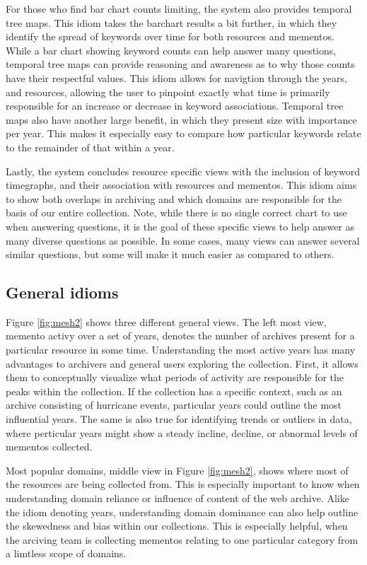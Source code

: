 \documentclass[10pt,journal,compsoc]{IEEEtran}
\begin{document}
For those who find bar chart counts limiting, the system also provides temporal tree maps. This idiom takes the barchart results a bit further, in which they identify the spread of keywords over time for both resources and mementos. While a bar chart showing keyword counts can help answer many questions, temporal tree maps can provide reasoning and awareness as to why those counts have their respectful values. This idiom allows for navigtion through the years, and resources, allowing the user to pinpoint exactly what time is primarily responsible for an increase or decrease in keyword associations. Temporal tree maps also have another large benefit, in which they present size with importance per year. This makes it especially easy to compare how particular keywords relate to the remainder of that within a year. \par

Lastly, the system concludes resource specific views with the inclusion of keyword timegraphs, and their association with resources and mementos. This idiom aims to show both overlaps in archiving and which domains are responsible for the basis of our entire collection. Note, while there is no single correct chart to use when answering questions, it is the goal of these specific views to help answer as many diverse questions as possible. In some cases, many views can answer several similar questions, but some will make it much easier as compared to others. \par

\subsection{General idioms}
Figure \ref{fig:mesh2} shows three different general views. The left most view, memento activy over a set of years, denotes the number of archives present for a particular resource in some time. Understanding the most active years has many advantages to archivers and general users exploring the collection. First, it allows them to conceptually visualize what periods of activity are responsible for the peaks within the collection. If the collection has a specific context, such as an archive consisting of hurricane events, particular years could outline the most influential years. The same is also true for identifying trends or outliers in data, where perticular years might show a steady incline, decline, or abnormal levels of mementos collected. \par

Most popular domains, middle view in Figure \ref{fig:mesh2}, shows where most of the resources are being collected from. This is especially important to know when understanding domain reliance or influence of content of the web archive. Alike the idiom denoting years, understanding domain dominance can also help outline the skewedness and bias within our collections. This is especially helpful, when the arciving team is collecting mementos relating to one particular category from a limtless scope of domains. \par
\end{document}
